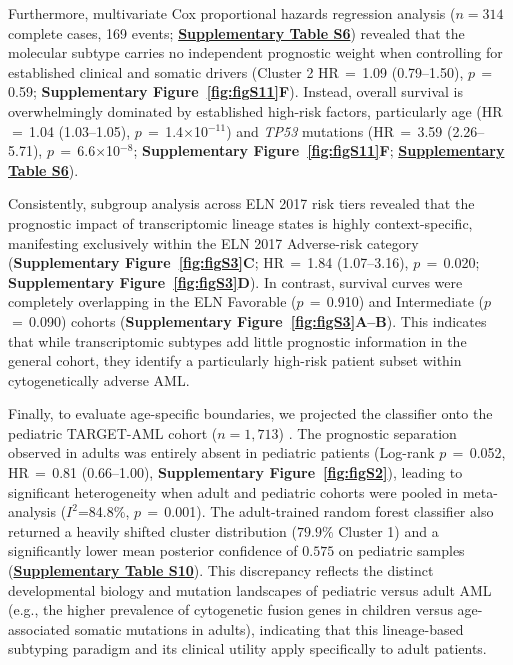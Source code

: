 \documentclass[11pt,a4paper]{article}
\newcommand{\pval}[1]{$p$\,$=$\,#1}
\newcommand{\hr}[3]{HR\,$=$\,#1 (#2--#3)}
\begin{document}
Furthermore, multivariate Cox proportional hazards regression analysis ($n=314$ complete cases, 169 events; \href{Supplementary_Methods.pdf#tab:tabS6}{\textbf{Supplementary Table S6}}) revealed that the molecular subtype carries no independent prognostic weight when controlling for established clinical and somatic drivers (Cluster 2 \hr{1.09}{0.79}{1.50}, \pval{0.59}; \textbf{Supplementary Figure~\ref{fig:figS11}F}). Instead, overall survival is overwhelmingly dominated by established high-risk factors, particularly age (\hr{1.04}{1.03}{1.05}, \pval{1.4$\times$10$^{-11}$}) and \textit{TP53} mutations (\hr{3.59}{2.26}{5.71}, \pval{6.6$\times$10$^{-8}$}; \textbf{Supplementary Figure~\ref{fig:figS11}F}; \href{Supplementary_Methods.pdf#tab:tabS6}{\textbf{Supplementary Table S6}}).

Consistently, subgroup analysis across ELN 2017 risk tiers revealed that the prognostic impact of transcriptomic lineage states is highly context-specific, manifesting exclusively within the ELN 2017 Adverse-risk category (\textbf{Supplementary Figure~\ref{fig:figS3}C}; \hr{1.84}{1.07}{3.16}, \pval{0.020}; \textbf{Supplementary Figure~\ref{fig:figS3}D}). In contrast, survival curves were completely overlapping in the ELN Favorable (\pval{0.910}) and Intermediate (\pval{0.090}) cohorts (\textbf{Supplementary Figure~\ref{fig:figS3}A--B}). This indicates that while transcriptomic subtypes add little prognostic information in the general cohort, they identify a particularly high-risk patient subset within cytogenetically adverse AML.

Finally, to evaluate age-specific boundaries, we projected the classifier onto the pediatric TARGET-AML cohort ($n=1{,}713$) \cite{bolouri2018target}. The prognostic separation observed in adults was entirely absent in pediatric patients (Log-rank \pval{0.052}, \hr{0.81}{0.66}{1.00}, \textbf{Supplementary Figure~\ref{fig:figS2}}), leading to significant heterogeneity when adult and pediatric cohorts were pooled in meta-analysis ($I^2$=84.8\%, \pval{0.001}). The adult-trained random forest classifier also returned a heavily shifted cluster distribution ($79.9\%$ Cluster 1) and a significantly lower mean posterior confidence of $0.575$ on pediatric samples (\href{Supplementary_Methods.pdf#tab:tabS10}{\textbf{Supplementary Table S10}}). This discrepancy reflects the distinct developmental biology and mutation landscapes of pediatric versus adult AML (e.g., the higher prevalence of cytogenetic fusion genes in children versus age-associated somatic mutations in adults), indicating that this lineage-based subtyping paradigm and its clinical utility apply specifically to adult patients.
\end{document}
